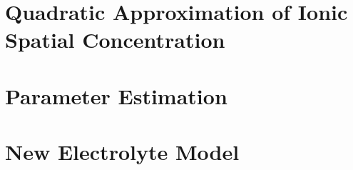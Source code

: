 \section{Quadratic Approximation of Ionic Spatial Concentration}\label{sec:quadraticapprox}

\section{ Parameter Estimation}\label{sec:spmparameterestim}

\section{New Electrolyte Model}\label{sec:newelectrolytemodel}




